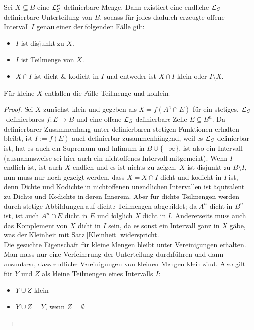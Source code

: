 \begin{theorem}\label{Satz 4}
	Sei $X\subseteq B$ eine $\mathcal{L}^P_S$-definierbare Menge. Dann existiert eine endliche $\mathcal{L}_S$-definierbare Unterteilung von $B$, sodass für jedes dadurch erzeugte offene Intervall $I$ genau einer der folgenden Fälle gilt:
	\begin{itemize}
		\item $I$ ist disjunkt zu $X$.
		\item $I$ ist Teilmenge von $X$.
		\item $X\cap I$ ist dicht \& kodicht in $I$ und entweder ist $X\cap I$ klein oder $I\setminus X$.
	\end{itemize}
	Für kleine $X$ entfallen die Fälle \glqq{}Teilmenge\grqq{} und \glqq{}koklein\grqq{}.
\end{theorem}
\begin{proof}
	Sei $X$ zunächst klein und gegeben als $X=f(A^n\cap E)$ für ein stetiges, $\mathcal{L}_S$-definierbares $f:E\rightarrow B$ und eine offene $\mathcal{L}_S$-definierbare Zelle $E\subseteq B^n$. Da definierbarer Zusammenhang unter definierbaren stetigen Funktionen erhalten bleibt, ist $I:=f(E)$ auch definierbar zusammenhängend, weil es $\mathcal{L}_S$-definierbar ist, hat es auch ein Supremum und Infimum in $B\cup\{\pm\infty\}$, ist also ein Intervall (ausnahmsweise sei hier auch ein nichtoffenes Intervall mitgemeint). Wenn $I$ endlich ist, ist auch $X$ endlich und es ist nichts zu zeigen. $X$ ist disjunkt zu $B\setminus I$, nun muss nur noch gezeigt werden, dass $X=X\cap I$ dicht und kodicht in $I$ ist, denn Dichte und Kodichte in nichtoffenen unendlichen Intervallen ist äquivalent zu Dichte und Kodichte in deren Innerem. Aber für dichte Teilmengen werden durch stetige Abbildungen auf dichte Teilmengen abgebildet; da $A^n$ dicht in $B^n$ ist, ist auch $A^n\cap E$ dicht in $E$ und folglich $X$ dicht in $I$. Andererseits muss auch das Komplement von $X$ dicht in $I$ sein, da es sonst ein Intervall ganz in $X$ gäbe, was der Kleinheit mit Satz \ref{Kleinheit} widerspricht.\\
	Die gesuchte Eigenschaft für kleine Mengen bleibt unter Vereinigungen erhalten. Man muss nur eine Verfeinerung der Unterteilung durchführen und dann ausnutzen, dass endliche Vereinigungen von kleinen Mengen klein sind. Also gilt für $Y$ und $Z$ als kleine Teilmengen eines Intervalls $I$:
	\begin{itemize}
		\item $Y\cup Z$ klein
		\item $Y\cup Z=Y$, wenn $Z=\emptyset$

\end{itemize}
\end{proof}
